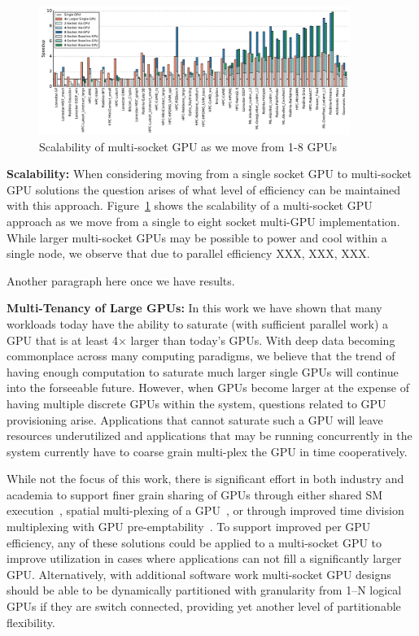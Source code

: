 \begin{figure}[t]
    \centering
    \includegraphics[width=0.9\textwidth]{figures/plot_scalability_mgpu_WB.pdf}
    \caption{Scalability of multi-socket GPU as we move from 1-8 GPUs}
    \label{fig:scalability}
\end{figure}

\textbf{Scalability:} When considering moving from a single socket GPU to
multi-socket GPU solutions the question arises of what level of efficiency
can be maintained with this approach.  Figure~\ref{fig:scalability} shows the
scalability of a multi-socket GPU approach as we move from a single to 
eight socket multi-GPU implementation.  While larger multi-socket GPUs
may be possible to power and cool within a single node, we observe that due
to parallel efficiency XXX, XXX, XXX.

Another paragraph here once we have results.\vspace{1in}

\textbf{Multi-Tenancy of Large GPUs:} In this work we have shown that many 
workloads today have the ability to
saturate (with sufficient parallel work) a GPU that is at least 4$\times$
larger than today's GPUs.  With deep data becoming commonplace across many
computing paradigms, we believe that the trend of having enough computation
to saturate much larger single GPUs will continue into the forseeable future.
However, when GPUs become larger at the expense of having multiple discrete
GPUs within the system, questions related to GPU provisioning arise.  Applications
that cannot saturate such a GPU will leave resources underutilized and applications
that may be running concurrently in the system currently have to coarse grain
multi-plex the GPU in time cooperatively.  

While not the focus of this work,
there is significant effort in both industry and academia to support finer
grain sharing of GPUs through either shared SM execution~\cite{XXX}, spatial
multi-plexing of a GPU~\cite{XXX}, or through improved time division multiplexing
with GPU pre-emptability~\cite{XXX}.  To support improved per GPU efficiency,
any of these solutions could be applied to a multi-socket GPU to improve utilization
in cases where applications can not fill a significantly larger GPU.  Alternatively,
with additional software work multi-socket GPU designs should be able to be dynamically
partitioned with granularity from 1--N logical GPUs if they are switch connected, providing
yet another level of partitionable flexibility.

